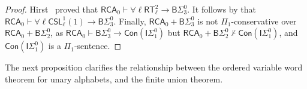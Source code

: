 \documentclass{article}
\numberwithin{theorem}{section}
\newtheorem{corollary}[theorem]{Corollary}
\newcommand{\RCA}{\mathsf{RCA}}
\newcommand{\CSL}{\mathsf{CSL}}
\newcommand{\BSig}{\mathsf{B}\Sigma^0}
\newcommand{\ISig}{\mathsf{I}\Sigma^0}
\newcommand{\RT}{\mathsf{RT}}
\begin{document}
\begin{proof}
Hirst~\cite[Theorem 6.11]{hirst1987combinatorics} proved that $\RCA_0 \vdash \forall \ell \RT^2_\ell \to \BSig_3$.
It follows by  that $\RCA_0 \vdash \forall \ell \CSL^1_\ell(1) \rightarrow \BSig_3$. Finally, $\RCA_0 + \BSig_3$ is not $\Pi_1$-conservative over~$\RCA_0 + \BSig_2$, as $\RCA_0 \vdash \BSig_3 \to \mathsf{Con}(\ISig_1)$ but $\RCA_0 + \BSig_2 \not \vdash \mathsf{Con}(\ISig_1)$, and $\mathsf{Con}(\ISig_1)$ is a $\Pi_1$-sentence.
\end{proof}

The next proposition clarifies the relationship between the ordered variable word theorem for unary alphabets, and the finite union theorem.
\end{document}
